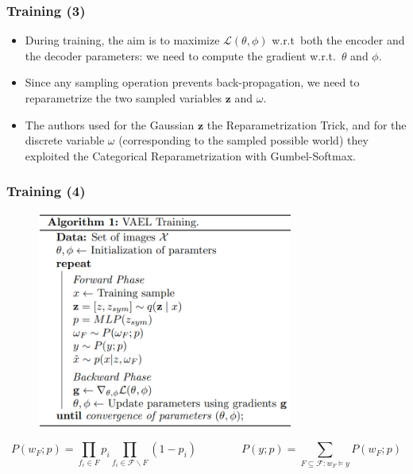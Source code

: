 \documentclass[10pt,xcolor={dvipsnames}]{beamer}
\begin{document}
\begin{frame}
    \frametitle{Training (3)}
    \begin{itemize}
        \item During training, the aim is to maximize $\mathcal{L}(\theta, \phi)$ w.r.t~both the encoder and the decoder parameters: we need to compute the gradient w.r.t.~$\theta$ and $\phi$.
        \item Since any sampling operation prevents back-propagation, we need to reparametrize the two sampled variables $\mathbf{z}$ and $\omega$.
        \item The authors used for the Gaussian $\mathbf{z}$ the Reparametrization Trick, and for the discrete variable $\omega$ (corresponding to the sampled possible world) they exploited the Categorical Reparametrization with Gumbel-Softmax.
    \end{itemize}
\end{frame}


\begin{frame}
    \frametitle{Training (4)}
    \begin{figure}[htb]
        \centering
        \includegraphics[width=0.75\textwidth]{figures/algorithm.png}
        \label{fig:algo}
    \end{figure}
    {\footnotesize
    $$
        P\left(w_{F} ; p\right)=\prod_{f_{i} \in F} p_{i} \prod_{f_{i} \in \mathcal{F} \backslash F}\left(1-p_{i}\right) \qquad\qquad
        P(y ; p)=\sum_{F \subseteq \mathcal{F}: w_{F} \models y} P\left(w_{F} ; p\right)
    $$
    }
\end{frame}
\end{document}
